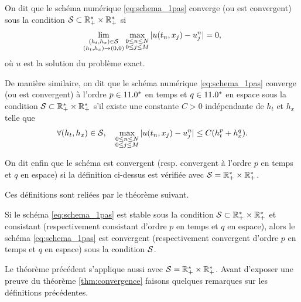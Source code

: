 \documentclass[12pt,a4paper,twoside]{article}
\begin{document}
\begin{definition}[Convergence]
  \label{def:convergence}
  On dit que le sch\'ema num\'erique \eqref{eq:schema_1pas} converge (ou est convergent) 
  sous la condition $\mathcal{S} \subset \mathbb{R}_+^* \times \mathbb{R}_+^*$
  si 
  \begin{align}
    \lim_{\substack{(h_t,h_x) \in \mathcal{S} \\ (h_t,h_x) \to (0,0)}} \max_{\substack{0\leq n \leq N\\ 0 \leq j \leq M}} 
    | u(t_n , x_j) - u_j^n | = 0 ,
  \end{align}
  o\`u $u$ est la solution du probl\`eme exact.
  
  De mani\`ere similaire, on dit que le sch\'ema num\'erique 
  \eqref{eq:schema_1pas} converge (ou est convergent) 
  \`a l'ordre $p\in11.0^*$ en temps et $q\in11.0^*$ en espace
  sous la condition $\mathcal{S} \subset \mathbb{R}_+^* \times \mathbb{R}_+^*$
  s'il existe une constante $C>0$ ind\'ependante de $h_t$ et $h_x$
  telle que
  \begin{align}
    \forall (h_t , h_x) \in \mathcal{S} , \quad \max_{\substack{0\leq n \leq N\\ 0 \leq j \leq M}}
    | u(t_n,x_j) - u_j^n | \leq C (h_t^p + h_x^q) .
  \end{align}

  On dit enfin que le sch\'ema est convergent (resp. convergent \`a l'ordre $p$
  en temps et $q$ en espace) si la d\'efinition ci-dessus est v\'erifi\'ee
  avec $\mathcal{S} = \mathbb{R}_+^* \times \mathbb{R}_+^*$.
\end{definition}

Ces d\'efinitions sont reli\'ees par le th\'eor\`eme suivant.
\begin{theorem}
  \label{thm:convergence}
  Si le sch\'ema \eqref{eq:schema_1pas} est stable sous la condition
  $\mathcal{S} \subset \mathbb{R}_+^* \times \mathbb{R}_+^*$ et consistant 
  (respectivement consistant d'ordre $p$ en temps et $q$ en espace),
  alors le sch\'ema \eqref{eq:schema_1pas} est convergent
  (respectivement convergent d'ordre $p$ en temps et $q$ en espace)
  sous la condition $\mathcal{S}$.
\end{theorem}
Le th\'eor\`eme pr\'ec\'edent s'applique aussi avec $\mathcal{S} = \mathbb{R}_+^* \times \mathbb{R}_+^*$.
Avant d'exposer une preuve du th\'eor\`eme \ref{thm:convergence}
faisons quelques remarques sur les d\'efinitions pr\'ec\'edentes.
\end{document}
